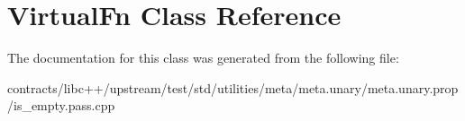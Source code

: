 \hypertarget{class_virtual_fn}{}\section{Virtual\+Fn Class Reference}
\label{class_virtual_fn}


The documentation for this class was generated from the following file\+:\begin{DoxyCompactItemize}
\item 
contracts/libc++/upstream/test/std/utilities/meta/meta.\+unary/meta.\+unary.\+prop/is\+\_\+empty.\+pass.\+cpp\end{DoxyCompactItemize}
